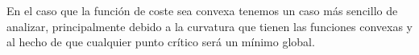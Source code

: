 En el caso que la función de coste sea convexa tenemos un caso más sencillo de analizar, principalmente debido a la curvatura que tienen las funciones convexas y al hecho de que cualquier punto crítico será un mínimo global.

